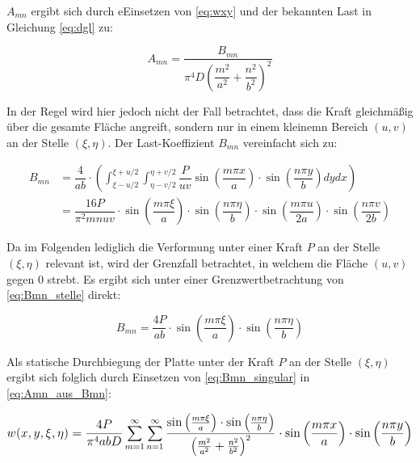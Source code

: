 $A_{mn}$ ergibt sich durch eEinsetzen von \ref{eq:wxy} und der bekannten Last in Gleichung \ref{eq:dgl} zu:

\begin{equation}
A_{mn} = \dfrac{B_{mn}}{\pi^4 D \left(\dfrac{m^2}{a^2} + \dfrac{n^2}{b^2} \right)^2}
\label{eq:Amn_aus_Bmn}
\end{equation}

In der Regel wird hier jedoch nicht der Fall betrachtet, dass die Kraft gleichmäßig über die gesamte Fläche angreift, sondern nur in einem kleinemn Bereich $(u,v)$ an der Stelle $(\xi, \eta)$. Der Last-Koeffizient $B_{mn}$ vereinfacht sich zu:

\begin{align}
B_{mn} &= \dfrac{4}{ab} \cdot \left( \int_{\xi-u/2}^{\xi+u/2} \int_{\eta - v/2}^{\eta + v/2} \dfrac{P}{u v}
\sin\left(\dfrac{m \pi x}{a}\right) \cdot \sin\left( \dfrac{n \pi y}{b} \right)dy dx\right) \\
&= \dfrac{16P}{\pi^2 m n u v} 
\cdot \sin\left(\dfrac{m \pi \xi}{a}\right) 
\cdot \sin\left(\dfrac{n \pi \eta}{b}\right) 
\cdot \sin\left(\dfrac{m \pi u}{2a}\right) 
\cdot \sin\left(\dfrac{n \pi v}{2b}\right)
\label{eq:Bmn_stelle}
\end{align}

Da im Folgenden lediglich die Verformung unter einer Kraft $P$ an der Stelle $(\xi, \eta)$ relevant ist, wird der Grenzfall betrachtet, in welchem die Fläche $(u,v)$ gegen 0 strebt. Es ergibt sich unter einer Grenzwertbetrachtung von \ref{eq:Bmn_stelle} direkt:

\begin{equation}
B_{mn} = \dfrac{4P}{a b} 
\cdot \sin\left(\dfrac{m \pi \xi}{a}\right) 
\cdot \sin\left(\dfrac{n \pi \eta}{b}\right) 
\label{eq:Bmn_singular}
\end{equation}

Als statische Durchbiegung der Platte unter der Kraft $P$ an der Stelle $(\xi, \eta)$ ergibt sich folglich durch Einsetzen von \ref{eq:Bmn_singular} in \ref{eq:Amn_aus_Bmn}:
 
\begin{equation}
 \mathlarger{
 	w(x,y,\xi,\eta) = \frac{4P}{\pi^4 a b D} 
 	\sum_{m = 1}^{\infty} \sum_{n = 1}^{\infty}
 	\frac{
 		\sin\left(\frac{m \pi \xi}{a}\right) 
 		\cdot \sin\left(\frac{n \pi \eta}{b}\right) 
 	}{
 		\left( 
 		\frac{m^2}{a^2} +
 		\frac{n^2}{b^2}
 		\right)^2
 	}
 	\cdot \sin\left(\frac{m \pi x}{a}\right) 
 	\cdot \sin\left(\frac{n \pi y}{b}\right) 
 }
 \end{equation}
 
